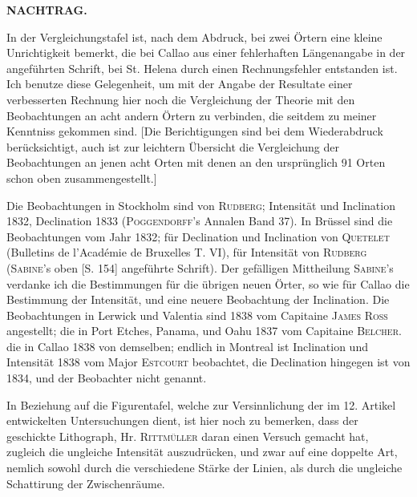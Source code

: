 \begin{center}\large\bfseries NACHTRAG.\end{center}
In der Vergleichungstafel ist, nach dem Abdruck, bei zwei Örtern eine kleine Unrichtigkeit bemerkt, die bei Callao aus einer fehlerhaften Längenangabe in der angeführten Schrift, bei St. Helena durch einen Rechnungsfehler entstanden ist. Ich benutze diese Gelegenheit, um mit der Angabe der Resultate einer verbesserten Rechnung hier noch die Vergleichung der Theorie mit den Beobachtungen an acht andern Örtern zu verbinden, die seitdem zu meiner Kenntniss gekommen sind. [Die Berichtigungen sind bei dem Wiederabdruck berücksichtigt, auch ist zur leichtern Übersicht die Vergleichung der Beobachtungen an jenen acht Orten mit denen an den ursprünglich 91 Orten schon oben zusammengestellt.]
\par\clearpage
{}
Die Beobachtungen in Stockholm sind von \textsc{Rudberg}; Intensität und Inclination 1832, Declination 1833 (\textsc{Poggendorff}’s Annalen Band 37). In Brüssel sind die Beobachtungen vom Jahr 1832; für Declination und Inclination von \textsc{Quetelet} (Bulletins de l’Académie de Bruxelles T. VI), für Intensität von \textsc{Rudberg} (\textsc{Sabine}’s oben [S. 154] angeführte Schrift). Der gefälligen Mittheilung \textsc{Sabine}’s verdanke ich die Bestimmungen für die übrigen neuen Örter, so wie für Callao die Bestimmung der Intensität, und eine neuere Beobachtung der Inclination. Die Beobachtungen in Lerwick und Valentia sind 1838 vom Capitaine \textsc{James Ross} angestellt; die in Port Etches, Panama, und Oahu 1837 vom Capitaine \textsc{Belcher}. die in Callao 1838 von demselben; endlich in Montreal ist Inclination und Intensität 1838 vom Major \textsc{Estcourt} beobachtet, die Declination hingegen ist von 1834, und der Beobachter nicht genannt.

In Beziehung auf die Figurentafel, welche zur Versinnlichung der im 12. Artikel entwickelten Untersuchungen dient, ist hier noch zu bemerken, dass der geschickte Lithograph, Hr. \textsc{Rittmüller} daran einen Versuch gemacht hat, zugleich die ungleiche Intensität auszudrücken, und zwar auf eine doppelte Art, nemlich sowohl durch die verschiedene Stärke der Linien, als durch die ungleiche Schattirung der Zwischenräume.


